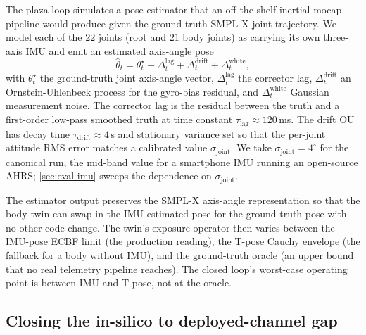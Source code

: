 \documentclass[journal,twocolumn,10pt]{IEEEtran}
\theoremstyle{plain}
\theoremstyle{remark}
\begin{document}
The plaza loop simulates a pose estimator that an off-the-shelf
inertial-mocap pipeline would produce given the ground-truth
SMPL-X joint trajectory. We model each of the $22$ joints (root and
$21$ body joints) as carrying its own three-axis IMU and emit an
estimated axis-angle pose
\begin{equation}\label{eq:imu-pose}
  \hat\theta_t = \theta^\star_t + \Delta_t^{\mathrm{lag}}
  + \Delta_t^{\mathrm{drift}} + \Delta_t^{\mathrm{white}},
\end{equation}
with $\theta^\star_t$ the ground-truth joint axis-angle vector,
$\Delta_t^{\mathrm{lag}}$ the corrector lag, $\Delta_t^{\mathrm{drift}}$
an Ornstein-Uhlenbeck process for the gyro-bias residual, and
$\Delta_t^{\mathrm{white}}$ Gaussian measurement noise. The
corrector lag is the residual between the truth and a first-order
low-pass smoothed truth at time constant $\tau_{\mathrm{lag}} \approx
120\,$ms. The drift OU has decay time $\tau_{\mathrm{drift}} \approx
4\,$s and stationary variance set so that the per-joint attitude
RMS error matches a calibrated value $\sigma_{\mathrm{joint}}$. We
take $\sigma_{\mathrm{joint}} = 4^\circ$ for the canonical run, the
mid-band value for a smartphone IMU running an open-source AHRS;
\cref{sec:eval-imu} sweeps the dependence on $\sigma_{\mathrm{joint}}$.

The estimator output preserves the SMPL-X axis-angle representation
so that the body twin can swap in the IMU-estimated pose for the
ground-truth pose with no other code change. The
twin's exposure operator then varies between the IMU-pose ECBF
limit (the production reading), the T-pose Cauchy envelope (the
fallback for a body without IMU), and the ground-truth
oracle (an upper bound that no real telemetry pipeline reaches).
The closed loop's worst-case operating point is between IMU and
T-pose, not at the oracle.

\subsection{Closing the in-silico to deployed-channel gap}\label{sec:csi-cal}
\end{document}
